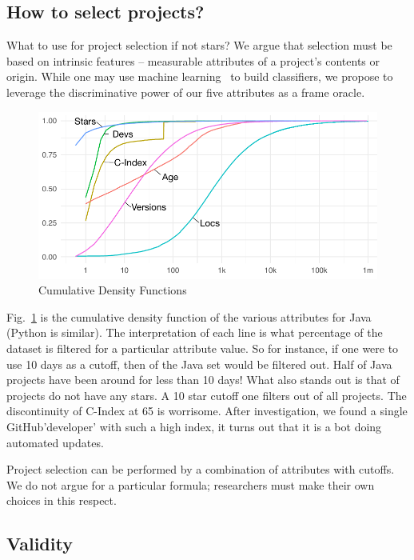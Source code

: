 \documentclass[sigconf,review,anonymous]{acmart}
\newcommand{\gh}{{GitHub}\xspace}
\begin{document}
\subsection{How to select projects?}

What to use for project selection if not stars? We argue that selection must be
based on intrinsic features -- measurable attributes of a project's contents or
origin. While one may use machine learning~\cite{mun17,pick19} to build
classifiers, we propose to leverage the discriminative power of our five
attributes as a frame oracle.

\begin{figure}[!t]
 \includegraphics[width=\columnwidth]{../figs/lang_cdf_annotated}
  \caption{Cumulative Density Functions}\label{cdf}
\end{figure}

Fig.~\ref{cdf} is the cumulative density function of the various attributes for
Java (Python is similar). The interpretation of each line is what percentage of
the dataset is filtered for a particular attribute value. So for instance, if
one were to use 10 days as a cutoff, then \javaLessThanTenDaysPct of the Java
set would be filtered out. Half of Java projects have been around for less than
10 days! What also stands out is that \javaNoStarsPct of projects do not have
any stars. A 10 star cutoff one filters out \javaLessThanTenStarsPct of all
projects. The discontinuity of C-Index at 65 is worrisome. After investigation,
we found a single \gh 'developer' with such a high index, it turns out that it
is a bot doing automated updates.

Project selection can be performed by a combination of attributes with cutoffs.
We do not argue for a particular formula; researchers must make their own choices
in this respect.

\subsection{Validity}
\end{document}
